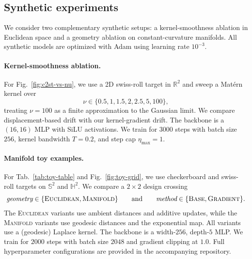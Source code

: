 \documentclass{article}
\theoremstyle{plain}
\begin{document}
\subsection{Synthetic experiments}

We consider two complementary synthetic setups: a kernel-smoothness ablation in Euclidean space and a geometry ablation on constant-curvature manifolds. All synthetic models are optimized with Adam using learning rate $10^{-3}$.

\paragraph{Kernel-smoothness ablation.}
For Fig.~\ref{fig:c2st-vs-nu}, we use a 2D swiss-roll target in $\mathbb{R}^2$ and sweep a Matérn kernel over
\[
\nu \in \{0.5, 1, 1.5, 2, 2.5, 5, 100\},
\]
treating $\nu=100$ as a finite approximation to the Gaussian limit. We compare displacement-based drift with our kernel-gradient drift. The backbone is a $(16,16)$ MLP with SiLU activations. We train for $3000$ steps with batch size $256$, kernel bandwidth $T=0.2$, and step cap $\eta_{\max}=1$.

\paragraph{Manifold toy examples.}
For Tab.~\ref{tab:toy-table} and Fig.~\ref{fig:toy-grid}, we use checkerboard and swiss-roll targets on $\mathbb{S}^2$ and $\mathbb{H}^2$. We compare a $2{\times}2$ design crossing
\[
\emph{geometry} \in \{\textsc{Euclidean}, \textsc{Manifold}\}
\qquad \text{and} \qquad
\emph{method} \in \{\textsc{Base}, \textsc{Gradient}\}.
\]
The \textsc{Euclidean} variants use ambient distances and additive updates, while the \textsc{Manifold} variants use geodesic distances and the exponential map. All variants use a (geodesic) Laplace kernel.
The backbone is a width-$256$, depth-$5$ MLP. We train for $2000$ steps with batch size $2048$ and gradient clipping at $1.0$. Full hyperparameter configurations are provided in the accompanying repository.
\end{document}
